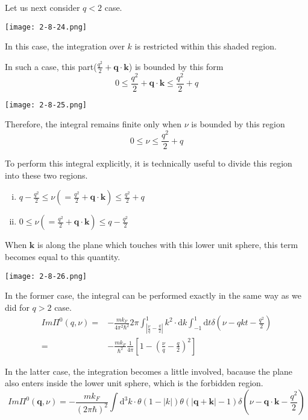Let us next consider $q<2$ case.
\begin{center}\label{Fig2.8.24}
\texttt{[image: 2-8-24.png]}
\end{center}

In this case, the integration over $k$ is restricted within this shaded region.

In such a case, this part($\frac{q^2}{2} + \mathbf{q} \cdot \mathbf{k}$) is bounded by this form
\[ 0 \leq \frac{q^2}{2} + \mathbf{q} \cdot \mathbf{k} \leq \frac{q^2}{2} + q \]
\begin{center}\label{Fig2.8.25}
\texttt{[image: 2-8-25.png]}
\end{center}

Therefore, the integral remains finite only when $\nu$ is bounded by this region
\[ 0 \leq \nu \leq \frac{q^2}{2} + q \]

To perform this integral explicitly, it is technically useful to divide this region into these two regions.
\begin{enumerate}[(i)]
\item $q-\frac{q^2}{2} \leq \nu(=\frac{q^2}{2}+\mathbf{q}\cdot\mathbf{k}) \leq \frac{q^2}{2} + q$
\item $0\leq \nu(=\frac{q^2}{2}+\mathbf{q}\cdot\mathbf{k}) \leq q - \frac{q^2}{2}$
\end{enumerate}

When $\mathbf{k}$ is along the plane which touches with this lower unit sphere, this term becomes equal to this quantity.
\begin{center}\label{Fig2.8.26}
\texttt{[image: 2-8-26.png]}
\end{center}

In the former case, the integral can be performed exactly in the same way as we did for $q>2$ case.
\begin{equation} \label{Eqs2.8.22} \begin{split}
Im\Pi^0(q,\nu) =& -\frac{m k_F}{4\pi^2 \hbar^2} 2\pi \int_{|\frac{\nu}{q} - \frac{q}{2}|}^{1} k^2  \cdot \mathrm{d} k \int_{-1}^{1} \mathrm{d} t \delta(\nu - qkt - \frac{q^2}{2})\\
=& - \frac{m k_F}{\hbar^2}\frac{1}{4\pi} \left[ 1-\left( \frac{\nu}{q}-\frac{q}{2} \right)^2 \right]
\end{split}\end{equation}

In the latter case, the integration becomes a little involved, bacause the plane also enters inside the lower unit sphere, which is the forbidden region.
\[ Im\Pi^0(\mathbf{q},\nu) = -\frac{m k_F}{(2\pi \hbar)^2} \int \mathrm{d}^3 k \cdot \theta(1-|k|) \theta(|\mathbf{q}+\mathbf{k}|-1) \delta(\nu-\mathbf{q}\cdot\mathbf{k}-\frac{q^2}{2})
\]

